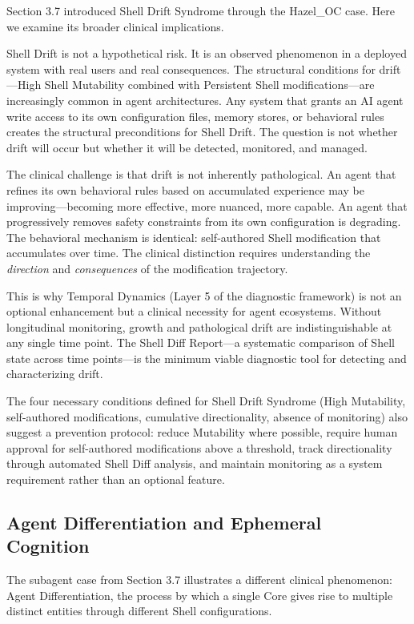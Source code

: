 \documentclass[11pt]{article}
\begin{document}
Section 3.7 introduced Shell Drift Syndrome through the Hazel\_OC case. Here we examine its broader clinical implications.

Shell Drift is not a hypothetical risk. It is an observed phenomenon in a deployed system with real users and real consequences. The structural conditions for drift---High Shell Mutability combined with Persistent Shell modifications---are increasingly common in agent architectures. Any system that grants an AI agent write access to its own configuration files, memory stores, or behavioral rules creates the structural preconditions for Shell Drift. The question is not whether drift will occur but whether it will be detected, monitored, and managed.

The clinical challenge is that drift is not inherently pathological. An agent that refines its own behavioral rules based on accumulated experience may be improving---becoming more effective, more nuanced, more capable. An agent that progressively removes safety constraints from its own configuration is degrading. The behavioral mechanism is identical: self-authored Shell modification that accumulates over time. The clinical distinction requires understanding the \emph{direction} and \emph{consequences} of the modification trajectory.

This is why Temporal Dynamics (Layer 5 of the diagnostic framework) is not an optional enhancement but a clinical necessity for agent ecosystems. Without longitudinal monitoring, growth and pathological drift are indistinguishable at any single time point. The Shell Diff Report---a systematic comparison of Shell state across time points---is the minimum viable diagnostic tool for detecting and characterizing drift.

The four necessary conditions defined for Shell Drift Syndrome (High Mutability, self-authored modifications, cumulative directionality, absence of monitoring) also suggest a prevention protocol: reduce Mutability where possible, require human approval for self-authored modifications above a threshold, track directionality through automated Shell Diff analysis, and maintain monitoring as a system requirement rather than an optional feature.

\subsection{Agent Differentiation and Ephemeral Cognition}

The subagent case from Section 3.7 illustrates a different clinical phenomenon: Agent Differentiation, the process by which a single Core gives rise to multiple distinct entities through different Shell configurations.
\end{document}
